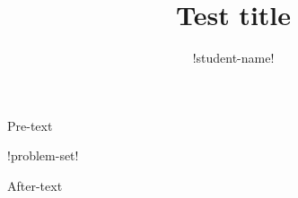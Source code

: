 \documentclass{article}
\title{Test title}
\author{!student-name!}
\date{}
\theoremstyle{definition}
\begin{document}
\maketitle
Pre-text

!problem-set!

After-text
\end{document}
